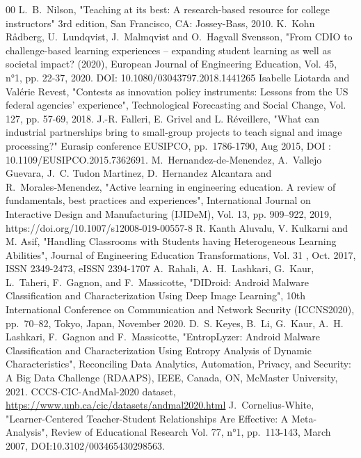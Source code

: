 \documentclass[conference]{IEEEtran}
\begin{document}
\begin{thebibliography}{00}
L.~B.~Nilson, "Teaching at its best: A research-based resource for college instructors" 3rd edition, San Francisco, CA: Jossey-Bass, 2010.
 K.~Kohn Rådberg, U.~Lundqvist, J.~Malmqvist and O.~Hagvall
Svensson, "From CDIO to challenge-based learning experiences – expanding student
learning as well as societal impact? (2020), European Journal of Engineering Education, Vol. 45, n°1, pp. 22-37, 2020. DOI:
10.1080/03043797.2018.1441265
 Isabelle Liotarda and Valérie Revest, "Contests as innovation policy instruments: Lessons from the US federal
agencies' experience", Technological Forecasting and Social Change, Vol. 127, pp. 57-69, 2018.
 J.-R. Falleri, E. Grivel and L. Réveillere, "What can industrial partnerships bring to small-group projects to teach signal and image processing?" Eurasip conference EUSIPCO,  pp.~1786-1790, Aug 2015, DOI : 10.1109/EUSIPCO.2015.7362691.
 M.~Hernandez-de-Menendez, A.~Vallejo Guevara, J.~C. Tudon Martinez, D.~Hernandez Alcantara and R.~Morales‑Menendez, "Active learning in engineering education. A review of fundamentals,
best practices and experiences", International Journal on Interactive Design and Manufacturing (IJIDeM),  Vol. 13, pp. 909–922, 2019, https://doi.org/10.1007/s12008-019-00557-8
 R. Kanth Aluvalu, V. Kulkarni and M. Asif, "Handling Classrooms with Students having Heterogeneous Learning Abilities", Journal of Engineering Education Transformations,
Vol. 31 , Oct. 2017, ISSN 2349-2473, eISSN 2394-1707
 A.~Rahali, A.~H.~Lashkari, G.~Kaur, L.~Taheri, F.~Gagnon, and F.~Massicotte, "DIDroid: Android Malware Classification and Characterization Using Deep Image Learning", 10th International Conference on Communication and Network Security (ICCNS2020), pp.~70–82, Tokyo, Japan, November 2020.
 D.~S. Keyes, B.~Li, G.~Kaur, A.~H. Lashkari, F.~Gagnon and F.~Massicotte, "EntropLyzer: Android Malware Classification and Characterization Using Entropy Analysis of Dynamic Characteristics", Reconciling Data Analytics, Automation, Privacy, and Security: A Big Data Challenge (RDAAPS), IEEE, Canada, ON, McMaster University, 2021.
 CCCS-CIC-AndMal-2020 dataset,\\ \url{https://www.unb.ca/cic/datasets/andmal2020.html}
 J.~Cornelius-White, "Learner-Centered Teacher-Student Relationships Are Effective: A Meta-Analysis",
 Review of Educational Research Vol. 77, n°1, pp.~113-143, March 2007, DOI:10.3102/003465430298563.
\end{thebibliography}
\end{document}
